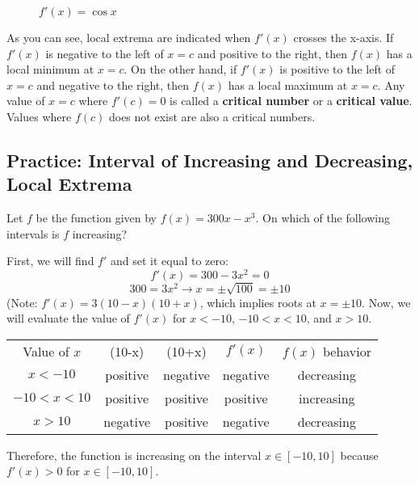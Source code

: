 \begin{figure}
	\centering
	\caption{$f'(x) = \cos{x}$}
	\label{fig:fprimecos}
\end{figure}


As you can see, local extrema are indicated when $f'(x)$ crosses the x-axis. 
If $f'(x)$ is negative to the left of $x=c$ and positive to the right, then 
$f(x)$ has a local minimum at $x=c$. On the other hand, if $f'(x)$ is positive 
to the left of $x=c$ and negative to the right, then $f(x)$ has a local 
maximum at $x=c$. Any value of $x=c$ where $f'(c) = 0$ is called a \textbf{
critical number} or a \textbf{critical value}. Values where $f(c)$ does not 
exist are also a critical numbers. 

\subsection{Practice: Interval of Increasing and Decreasing, Local Extrema}
\begin{Exercise}
    [label=incdec1]
    Let $f$ be the function given by $f(x) = 300x-x^3$. On which of the 
    following intervals is $f$ increasing?
\end{Exercise}

\begin{Answer}
    [ref=incdec1]
    First, we will find $f'$ and set it equal to zero: $$f'(x) = 300 - 3x^2 = 
    0$$ $$300=3x^2 \rightarrow x=\pm \sqrt{100} = \pm10$$ (Note: $f'(x) = 3(10 
    - x)(10 + x)$, which implies roots at $x=\pm10$. Now, we will evaluate the 
    value of $f'(x)$ for $x < -10$, $-10 < x < 10$, and $ x >10$. 
    \begin{center}
        \begin{tabular}{c|c|c|c|c}
        Value of $x$ & (10-x) & (10+x) & $f'(x)$ & $f(x)$ behavior\\
         $x<-10$    &  positive & negative& negative & decreasing\\
         $-10<x<10$    & positive & positive& positive& increasing\\
         $x>10$ & negative & positive & negative & decreasing
        \end{tabular}
    \end{center}
    Therefore, the function is increasing on the interval $x \in [-10, 10]$ 
    because $f'(x) >0$ for $x \in [-10, 10]$.
\end{Answer}

